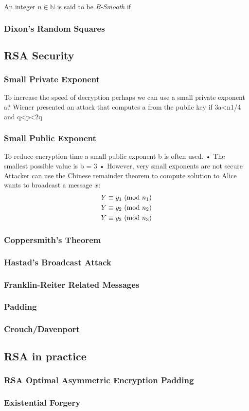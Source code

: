 \begin{definition}
    An integer $n \in \mathbb{N}$ is said to be \textit{B-Smooth} if
\end{definition}

\begin{example}
\end{example}
\subsubsection{Dixon’s Random Squares}

\subsection{RSA Security}
\subsubsection{Small Private Exponent}
To increase the speed of decryption perhaps we can use a small private exponent a?
Wiener presented an attack that computes a from the public key if 3a<n1/4 and q<p<2q
\subsubsection{Small Public Exponent}
To reduce encryption time a small public exponent b is often used.
• The smallest possible value is b = 3
• However, very small exponents are not secure
Attacker can use the Chinese remainder theorem to compute solution to
Alice wants to broadcast a message $x$:
\begin{align*}
    Y &\equiv y_1 \ (\mathrm{mod}\ n_1) \\
    Y &\equiv y_2 \ (\mathrm{mod}\ n_2) \\
    Y &\equiv y_3 \ (\mathrm{mod}\ n_3)
\end{align*}
\subsubsection{Coppersmith’s Theorem}
\subsubsection{Hastad’s Broadcast Attack}
\subsubsection{Franklin-Reiter Related Messages}
\subsubsection{Padding}
\subsubsection{Crouch/Davenport}

\subsection{RSA in practice}
\subsubsection{RSA Optimal Asymmetric Encryption Padding}
\subsubsection{Existential Forgery}
